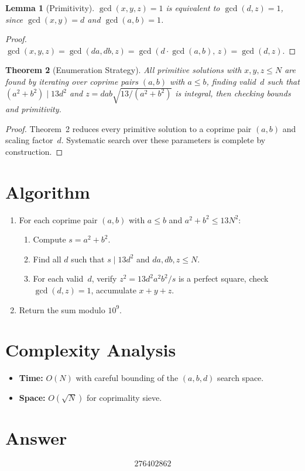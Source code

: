 \documentclass[11pt]{article}
\newtheorem{theorem}{Theorem}
\newtheorem{lemma}[theorem]{Lemma}
\theoremstyle{definition}
\begin{document}
\begin{lemma}[Primitivity]
$\gcd(x,y,z) = 1$ is equivalent to $\gcd(d,z) = 1$, since $\gcd(x,y) = d$ and $\gcd(a,b) = 1$.
\end{lemma}

\begin{proof}
$\gcd(x,y,z) = \gcd(da, db, z) = \gcd(d\cdot\gcd(a,b),\, z) = \gcd(d,z)$.
\end{proof}

\begin{theorem}[Enumeration Strategy]
All primitive solutions with $x,y,z \le N$ are found by iterating over coprime pairs $(a,b)$ with $a \le b$, finding valid~$d$ such that $(a^2+b^2) \mid 13d^2$ and $z = dab\sqrt{13/(a^2+b^2)}$ is integral, then checking bounds and primitivity.
\end{theorem}

\begin{proof}
Theorem~2 reduces every primitive solution to a coprime pair $(a,b)$ and scaling factor~$d$. Systematic search over these parameters is complete by construction.
\end{proof}

\section{Algorithm}

\begin{enumerate}
\item For each coprime pair $(a,b)$ with $a \le b$ and $a^2+b^2 \le 13N^2$:
  \begin{enumerate}
  \item Compute $s = a^2+b^2$.
  \item Find all $d$ such that $s \mid 13d^2$ and $da, db, z \le N$.
  \item For each valid~$d$, verify $z^2 = 13d^2 a^2 b^2/s$ is a perfect square, check $\gcd(d,z)=1$, accumulate $x+y+z$.
  \end{enumerate}
\item Return the sum modulo $10^9$.
\end{enumerate}

\section{Complexity Analysis}

\begin{itemize}
\item \textbf{Time:} $O(N)$ with careful bounding of the $(a,b,d)$ search space.
\item \textbf{Space:} $O(\sqrt{N})$ for coprimality sieve.
\end{itemize}

\section{Answer}

\[
\boxed{276402862}
\]
\end{document}
